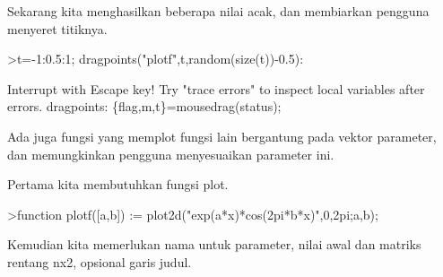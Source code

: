\begin{eulernotebook}
\begin{eulercomment}
Sekarang kita menghasilkan beberapa nilai acak, dan membiarkan
pengguna menyeret titiknya.
\end{eulercomment}
\begin{eulerprompt}
>t=-1:0.5:1; dragpoints("plotf",t,random(size(t))-0.5):
\end{eulerprompt}
\begin{euleroutput}
  Interrupt with Escape key!
  Try "trace errors" to inspect local variables after errors.
  dragpoints:
      \{flag,m,t\}=mousedrag(status);
\end{euleroutput}
\begin{eulercomment}
Ada juga fungsi yang memplot fungsi lain bergantung pada vektor
parameter, dan memungkinkan pengguna menyesuaikan parameter ini.

Pertama kita membutuhkan fungsi plot.
\end{eulercomment}
\begin{eulerprompt}
>function plotf([a,b]) := plot2d("exp(a*x)*cos(2pi*b*x)",0,2pi;a,b);
\end{eulerprompt}
\begin{eulercomment}
Kemudian kita memerlukan nama untuk parameter, nilai awal dan matriks
rentang nx2, opsional garis judul.


\end{eulercomment}
\end{eulernotebook}
